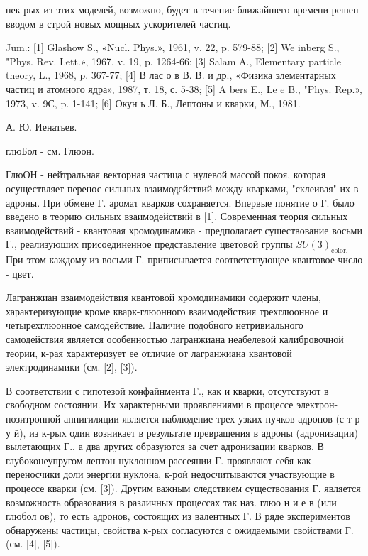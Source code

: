 \documentclass[10pt]{article}
\begin{document}
нек-рых из этих моделей, возможно, будет в течение ближайшего времени решен вводом в строй новых мощных ускорителей частиц.



Jum.: [1] Glashow S., «Nucl. Phys.», 1961, v. 22, p. 579-88; [2] We inberg S., "Phys. Rev. Lett.», 1967, v. 19, p. 1264-66; [3] Salam A., Elementary particle theory, L., 1968, p. 367-77; [4] В лас о в В. В. и др., «Физика элементарных частиц и атомного ядра», 1987, т. 18, с. 5-38; [5] A bers E., Le e B., "Phys. Rep.», 1973, v. 9С, p. 1-141; [6] Окун ь Л. Б., Лептоны и кварки, М., 1981.



А. Ю. Иенатьев.



глюБол - см. Глюон.



ГлюОН - нейтральная векторная частица с нулевой массой покоя, которая осуществляет перенос сильных взаимодействий между кварками, "склеивая" их в адроны. При обмене Г. аромат кварков сохраняется. Впервые понятие о Г. было введено в теорию сильных взаимодействий в [1]. Современная теория сильных взаимодействий - квантовая хромодинамика - предполагает сушествование восьми Г., реализуюших присоединенное представление цветовой группы $S U(3)_{\text {color. }}$ При этом каждому из восьми $Г$. приписывается соответствующее квантовое число - цвет.



Лагранжиан взаимодействия квантовой хромодинамики содержит члены, характеризующие кроме кварк-глюонного взаимодействия трехглюонное и четырехглюонное самодействие. Наличие подобного нетривиального самодействия является особенностью лагранжиана неабелевой калибровочной теории, к-рая характеризует ее отличие от лагранжиана квантовой электродинамики (см. [2], [3]).



В соответствии с гипотезой конфайнмента Г., как и кварки, отсутствуют в свободном состоянии. Их характерными проявлениями в процессе электрон-позитронной аннигиляции является наблюдение трех узких пучков адронов (с т р у й), из к-рых один возникает в результате превращения в адроны (адронизации) вылетающих Г., а два других образуются за счет адронизации кварков. В глубоконеупругом лептон-нуклонном рассеянии Г. проявляют себя как переносчики доли энергии нуклона, к-рой недосчитываются участвующие в процессе кварки (см. [3]). Другим важным следствием существования Г. является возможность образования в различных процессах так наз. глюо н и е в (или глюбол ов), то есть адронов, состоящих из валентных Г. В ряде экспериментов обнаружены частицы, свойства к-рых согласуются с ожидаемыми свойствами Г. (см. [4], [5]).
\end{document}
